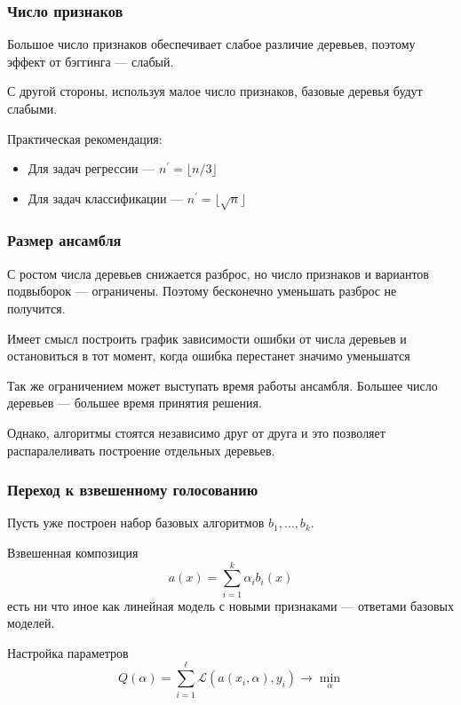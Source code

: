 \documentclass{beamer}
\begin{document}
	\begin{frame}
		\frametitle{Число признаков}

		Большое число признаков обеспечивает слабое различие деревьев, поэтому эффект
		от бэггинга --- слабый.

		С другой стороны, используя малое число признаков, базовые деревья будут слабыми.

		\vspace{15pt}

		Практическая рекомендация:
		\begin{itemize}
			\item Для задач регрессии --- $n^{'} = \lfloor n / 3 \rfloor$
			\item Для задач классификации --- $n^{'} = \lfloor \sqrt{n} \rfloor$
		\end{itemize}
	\end{frame}

	\begin{frame}
		\frametitle{Размер ансамбля}

		С ростом числа деревьев снижается разброс, но число признаков и вариантов подвыборок --- ограничены.
		Поэтому бесконечно уменьшать разброс не получится.

		\vspace{15pt}

		Имеет смысл построить график зависимости ошибки от числа деревьев и остановиться в тот момент, когда
		ошибка перестанет значимо уменьшатся

		\vspace{15pt}

		Так же ограничением может выступать время работы ансамбля. Большее число деревьев --- большее время принятия решения.

		Однако, алгоритмы стоятся независимо друг от друга и это позволяет распаралеливать построение отдельных деревьев.
	\end{frame}


	\begin{frame}
		\frametitle{Переход к взвешенному голосованию}

		Пусть уже построен набор базовых алгоритмов $b_1, \dots, b_k$.

		Взвешенная композиция
		\[
		a(x) = \sum_{i=1}^{k} \alpha_i b_i(x)
		\]
		есть ни что иное как линейная модель с новыми признаками --- ответами базовых моделей.

		\vspace{15pt}

		Настройка параметров
		\[
		Q(\alpha) = \sum_{i=1}^{\ell} \mathcal{L} (a(x_i, \alpha), y_i) \rightarrow \min_{\alpha}
		\]
	\end{frame}
\end{document}
